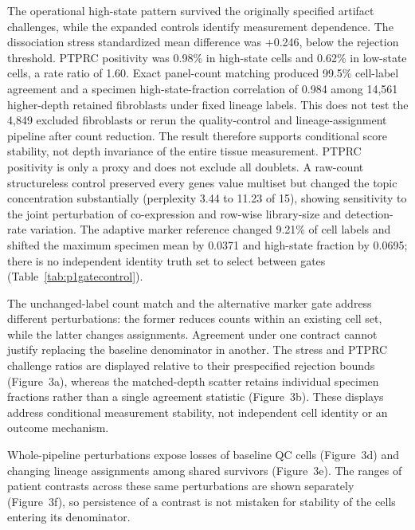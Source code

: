 \documentclass[10pt,a4paper]{article}
\begin{document}
The operational high-state pattern survived the originally specified artifact challenges, while the expanded controls identify measurement dependence. The dissociation stress standardized mean difference was +0.246, below the rejection threshold. PTPRC positivity was 0.98\% in high-state cells and 0.62\% in low-state cells, a rate ratio of 1.60. Exact panel-count matching produced 99.5\% cell-label agreement and a specimen high-state-fraction correlation of 0.984 among 14,561 higher-depth retained fibroblasts under fixed lineage labels. This does not test the 4,849 excluded fibroblasts or rerun the quality-control and lineage-assignment pipeline after count reduction. The result therefore supports conditional score stability, not depth invariance of the entire tissue measurement. PTPRC positivity is only a proxy and does not exclude all doublets. A raw-count structureless control preserved every gene\textquotesingle{}s value multiset but changed the topic concentration substantially (perplexity 3.44 to 11.23 of 15), showing sensitivity to the joint perturbation of co-expression and row-wise library-size and detection-rate variation. The adaptive marker reference changed 9.21\% of cell labels and shifted the maximum specimen mean by 0.0371 and high-state fraction by 0.0695; there is no independent identity truth set to select between gates (Table~\ref{tab:p1gatecontrol}).

The unchanged-label count match and the alternative marker gate address different perturbations: the former reduces counts within an existing cell set, while the latter changes assignments. Agreement under one contract cannot justify replacing the baseline denominator in another. 
\FloatBarrier
The stress and PTPRC challenge ratios are displayed relative to their prespecified rejection bounds (Figure~3a\label{call:p1f3}), whereas the matched-depth scatter retains individual specimen fractions rather than a single agreement statistic (Figure~3b). These displays address conditional measurement stability, not independent cell identity or an outcome mechanism.




Whole-pipeline perturbations expose losses of baseline QC cells (Figure~3d) and changing lineage assignments among shared survivors (Figure~3e). The ranges of patient contrasts across these same perturbations are shown separately (Figure~3f), so persistence of a contrast is not mistaken for stability of the cells entering its denominator.
\end{document}
